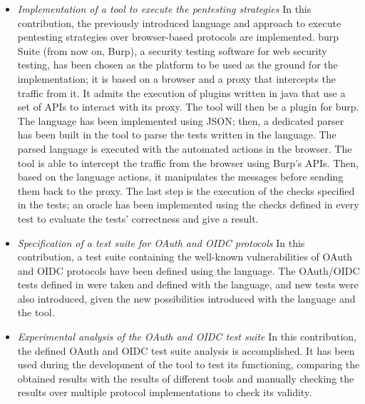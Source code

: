 \begin{itemize}
    \item \textit{Implementation of a tool to execute the pentesting strategies} In this contribution, the previously introduced language and approach to execute pentesting strategies over browser-based protocols are implemented. \gls{burp} Suite (from now on, Burp), a security testing software for web security testing, has been chosen as the platform to be used as the ground for the implementation; it is based on a browser and a proxy that intercepts the traffic from it. It admits the execution of plugins written in java that use a set of APIs to interact with its proxy. The tool will then be a plugin for \gls{burp}. The language has been implemented using JSON; then, a dedicated parser has been built in the tool to parse the tests written in the language. The parsed language is executed with the automated actions in the browser. The tool is able to intercept the traffic from the browser using Burp's APIs. Then, based on the language actions, it manipulates the messages before sending them back to the proxy. The last step is the execution of the checks specified in the tests; an oracle has been implemented using the checks defined in every test to evaluate the tests' correctness and give a result.
    \item \textit{Specification of a test suite for OAuth and OIDC protocols} In this contribution, a test suite containing the well-known vulnerabilities of OAuth and OIDC protocols have been defined using the language. The OAuth/OIDC tests defined in \cite{claudio_grisenti, wendy_barreto} were taken and defined with the language, and new tests were also introduced, given the new possibilities introduced with the language and the tool.
    \item \textit{Experimental analysis of the OAuth and OIDC test suite} In this contribution, the defined OAuth and OIDC test suite analysis is accomplished. It has been used during the development of the tool to test its functioning, comparing the obtained results with the results of different tools and manually checking the results over multiple protocol implementations to check its validity.
\end{itemize}

